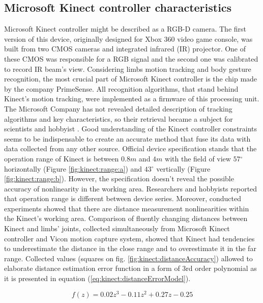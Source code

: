 \documentclass[sensors,article,submit,moreauthors,pdftex,10pt,a4paper]{mdpi}
\newcommand{\degree}{\ensuremath{{}^{\circ}}\xspace}
\begin{document}
\subsection{Microsoft Kinect controller characteristics}
Microsoft Kinect controller might be described as a RGB-D camera. The first version of this device, originally designed for Xbox 360 video game console, was built from two CMOS cameras and integrated infrared (IR) projector. One of these CMOS was responsible for a RGB signal and the second one was calibrated to record IR beam’s view. Considering limbs motion tracking and body gesture recognition, the most crucial part of Microsoft Kinect controller is the chip made by the company PrimeSense. All recognition algorithms, that stand behind Kinect’s motion tracking, were implemented as a firmware of this processing unit. 
The Microsoft Company has not revealed detailed description of tracking algorithms and key characteristics, so their retrieval became a subject for scientists and hobbyist \cite{Skalski2015,Gonzalez-Jorge2013,Khoshelham2012}. Good understanding of the Kinect controller constraints seems to be indispensable to create an accurate method that fuse its data with data collected from any other source. 
Official device specification stands that the operation range of Kinect is between $0.8m$ and $4m$ with the field of view $57\degree$ horizontally (Figure \ref{fig:kinect:range:a}) and $43\degree$ vertically (Figure \ref{fig:kinect:range:b}). However, the specification doesn't reveal the possible accuracy of nonlinearity in the working area. Researchers \cite{DiFilippo2015} and hobbyists \cite{stack:kinect2011} reported that operation range is different between device series. Moreover, conducted experiments showed that there are distance measurement nonlinearities within the Kinect’s working area.
Comparison of fluently changing distances between Kinect and limbs' joints, collected simultaneously from Microsoft Kinect controller and Vicon motion capture system, showed that Kinect had tendencies to underestimate the distance in the close range and to overestimate it in the far range. Collected values (squares on fig. \ref{fig:kinect:distanceAccuracy}) allowed to elaborate distance estimation error function in a form of 3rd order polynomial as it is presented in equation (\ref{eq:kinect:distanceErrorModel}).

\begin{equation}
	f(z)=0.02z^3-0.11z^2+0.27z-0.25 
	\label{eq:kinect:distanceErrorModel}
\end{equation}
\end{document}
